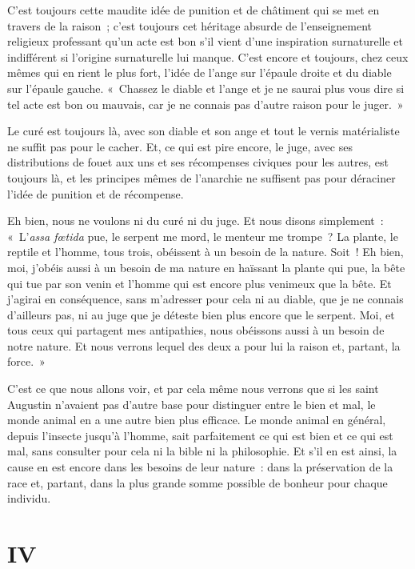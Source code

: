 \documentclass[french,twoside]{book} %
\begin{document}
\bigbreak
\noindent C’est toujours cette maudite idée de punition et de châtiment qui se met en travers de la raison ; c’est toujours cet héritage absurde de l’enseignement religieux professant qu’un acte est bon s’il vient d’une inspiration surnaturelle et indifférent si l’origine surnaturelle lui manque. C’est encore et toujours, chez ceux mêmes qui en rient le plus fort, l’idée de l’ange sur l’épaule droite et du diable sur l’épaule gauche. « Chassez le diable et l’ange et je ne saurai plus vous dire si tel acte est bon ou mauvais, car je ne connais pas d’autre raison pour le juger. »\par
Le curé est toujours là, avec son diable et son ange et tout le vernis matérialiste ne suffit pas pour le cacher. Et, ce qui est pire encore, le juge, avec ses distributions de fouet aux uns et ses récompenses civiques pour les autres, est toujours là, et les principes mêmes de l’anarchie ne suffisent pas pour déraciner l’idée de punition et de récompense.\par
 Eh bien, nous ne voulons ni du curé ni du juge. Et nous disons simplement : « L’\emph{assa fœtida} pue, le serpent me mord, le menteur me trompe ? La plante, le reptile et l’homme, tous trois, obéissent à un besoin de la nature. Soit ! Eh bien, moi, j’obéis aussi à un besoin de ma nature en haïssant la plante qui pue, la bête qui tue par son venin et l’homme qui est encore plus venimeux que la bête. Et j’agirai en conséquence, sans m’adresser pour cela ni au diable, que je ne connais d’ailleurs pas, ni au juge que je déteste bien plus encore que le serpent. Moi, et tous ceux qui partagent mes antipathies, nous obéissons aussi à un besoin de notre nature. Et nous verrons lequel des deux a pour lui la raison et, partant, la force. »\par
C’est ce que nous allons voir, et par cela même nous verrons que si les saint Augustin n’avaient pas d’autre base pour distinguer entre le bien et mal, le monde animal en a une autre bien plus efficace. Le monde animal en général, depuis l’insecte jusqu’à l’homme, sait parfaitement ce qui est bien et ce qui est mal, sans consulter pour cela ni la bible ni la philosophie. Et s’il en est ainsi, la cause en est encore dans les besoins de leur nature : dans la préservation de la race et, partant, dans la plus grande somme possible de bonheur pour chaque individu.
\section[{IV}]{IV}
\label{p04}\renewcommand{\leftmark}{IV}
\end{document}

